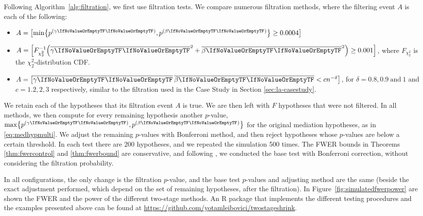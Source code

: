 \documentclass[ejs, twoside]{imsart}
\theoremstyle{plain}
\theoremstyle{remark}
\newcommand{\andtext}{\ \mathrm{and}\ }
\newcommand{\pvalue}{\(p\)-value}
\newcommand{\estim}[1]{\avg{\regcoef{#1}}}
\numberwithin{equation}{section}
\numberwithin{table}{section}
\numberwithin{figure}{section}
\let\originalleft\left
\let\originalright\right
\renewcommand{\left}{\mathopen{}\mathclose\bgroup\originalleft}
\renewcommand{\right}{\aftergroup\egroup\originalright}
\begin{document}
Following Algorithm~\ref{alg:filtration}, we first use filtration tests. We compare numerous filtration methods, where the filtering event \(A\) is each of the following:%
\begin{itemize}
	\item \(A = \left[\min\left\lbrace \regpval{1}, \regpval{2} \right\rbrace \geq 0.0004\right] \)
	\item \(A = \left[ F_{\chi_2^2}^{-1}\left( \estim{1}^2 + \estim{2}^2\right) \geq 0.001 \right] \), where \(F_{\chi_2^2}\) is the \(\chi_2^2\)-distribution CDF.
	\item \(A = \left[ \product < cn^{-\delta}\right] \), for \(\delta = 0.8, 0.9 \andtext 1\) and \(c = 1.2, 2, 3\) respectively, similar to the filtration used in the Case Study in Section \ref{sec:la-casestudy}.
\end{itemize}
%
We retain each of the hypotheses that its filtration event \(A\) is true. We are then left with \(F\) hypotheses that were not filtered. In all methods, we then compute for every remaining hypothesis another \pvalue{}, \(\max\left\lbrace \regpval{1}, \regpval{2} \right\rbrace\) for the original mediation hypotheses, as in \eqref{eq:medhypmulti}. We adjust the remaining \pvalue{}s with Bonferroni method, and then reject hypotheses whose \pvalue{}s are below a certain threshold. In each test there are 200 hypotheses, and we repeated the simulation 500 times. The FWER bounds in Theorems \ref{thm:fwercontrol} and \ref{thm:fwerbound} are conservative, and following \citet{djordjilovic_optimal_2020}, we conducted the base test with Bonferroni correction, without considering the filtration probability.

In all configurations, the only change is the filtration \pvalue{}, and the base test \pvalue{}s and adjusting method are the same (beside the exact adjustment performed, which depend on the set of remaining hypotheses, after the filtration). In Figure~\ref{fig:simulatedfwerpower} are shown the FWER and the power of the different two-stage methods. An R package that implements the different testing procedures and the examples presented above can be found at \url{https://github.com/yotamleibovici/twostageshrink}.
\end{document}
